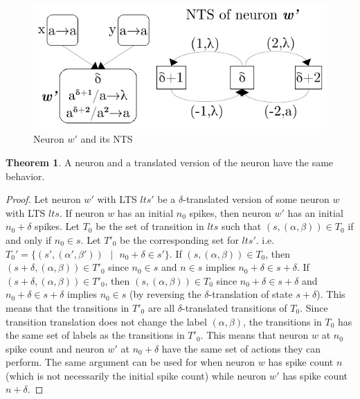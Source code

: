 \documentclass[]{elsarticle}
\theoremstyle{definition}
\theoremstyle{definition}
\newtheorem{lemma}{Theorem}
\newcommand{\se}{\text{ }}
\begin{document}
\begin{figure}[H]
   \centering
   \includegraphics[scale=0.70]{fig-lts-3.pdf}
   \caption{Neuron $w'$ and its NTS}
   \label{fig-nts-3}
\end{figure}


\begin{lemma}
A neuron and a translated version of the neuron have the same behavior.
\end{lemma}

\begin{proof}
Let neuron $w'$ with LTS $lts'$ be a $\delta$-translated version of some neuron $w$ with LTS $lts$. 
If neuron $w$ has an initial $n_0$ spikes, then neuron $w'$ has an initial $n_0+\delta$ spikes. Let 
$T_0$ be the set of transition in $lts$ such that $(s,(\alpha,\beta))\in T_0$ if and only if 
$n_0\in s$. Let $T'_0$ be the corresponding set for $lts'$. i.e. $T_0'=\{(s',(\alpha',\beta'))\se|\se
n_0+\delta \in s'\}$. If $(s,(\alpha,\beta))\in T_0$, then $(s+\delta,(\alpha,\beta)) \in T'_0$ since
$n_0\in s$ and $n\in s$ implies $n_0+\delta \in s+\delta$. If  $(s+\delta,(\alpha,\beta)) \in T'_0$,
then $(s,(\alpha,\beta))\in T_0$ since $n_0+\delta \in s+\delta$ and $n_0+\delta \in s+\delta$ implies
$n_0\in s$ (by reversing the $\delta$-translation of state $s+\delta$). This means that the 
transitions in $T'_0$ are all $\delta$-translated transitions of $T_0$. Since transition translation
does not change the label $(\alpha,\beta)$, the transitions in $T_0$ has the same set of labels as
the transitions in $T'_0$. This means that neuron $w$ at $n_0$ spike count and neuron $w'$ at $n_0+
\delta$ have the same set of actions they can perform. The same argument can be used for when neuron
$w$ has spike count $n$ (which is not necessarily the initial spike count) while neuron $w'$ has
spike count $n+\delta$.
\end{proof}
\end{document}
